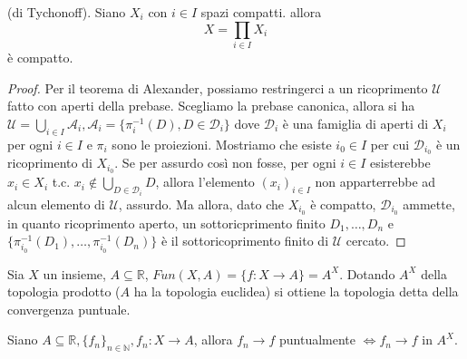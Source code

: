 \begin{thm} \label{tychonoff}
    (di Tychonoff). Siano $X_i$ con $i\in I$ spazi compatti. allora
    \[
        X=\prod_{i\in I}X_i
    \]
    \`e compatto.
\end{thm}
\begin{proof}
  Per il teorema di Alexander, possiamo restringerci a un ricoprimento $\mathcal{U}$ fatto con aperti della prebase. Scegliamo la prebase canonica, allora si ha $\displaystyle \mathcal{U}=\bigcup_{i \in I} \mathcal{A}_i, \mathcal{A}_i=\{\pi_i^{-1}(D), D \in \mathcal{D}_i\}$ dove $\mathcal{D}_i$ è una famiglia di aperti di $X_i$ per ogni $i \in I$ e $\pi_i$ sono le proiezioni.
  Mostriamo che esiste $i_0 \in I$ per cui $\mathcal{D}_{i_0}$ è un ricoprimento di $X_{i_0}$. Se per assurdo così non fosse, per ogni $i \in I$ esisterebbe $x_i \in X_i$ t.c. $\displaystyle x_i \not \in \bigcup_{D \in \mathcal{D}_i} D$, allora l'elemento $(x_i)_{i \in I}$ non apparterrebbe ad alcun elemento di $\mathcal{U}$, assurdo.
  Ma allora, dato che $X_{i_0}$ è compatto, $\mathcal{D}_{i_0}$ ammette, in quanto ricoprimento aperto, un sottoricprimento finito $D_1, \dots, D_n$ e $\{\pi_{i_0}^{-1}(D_1), \dots, \pi_{i_0}^{-1}(D_n)\}$ è il sottoricoprimento finito di $\mathcal{U}$ cercato.
\end{proof}

\begin{ex}
  Sia $X$ un insieme, $A \subseteq \mathbb{R}$, $Fun(X, A)=\{f:X \rightarrow A\}=A^X$. Dotando $A^X$ della topologia prodotto ($A$ ha la topologia euclidea) si ottiene la topologia detta della convergenza puntuale.
\end{ex}

\begin{lm}
  Siano $A \subseteq \mathbb{R}, \{f_n\}_{n \in \mathbb{N}}, f_n:X \rightarrow A$, allora $f_n \rightarrow f$ puntualmente $\Leftrightarrow f_n \rightarrow f$ in $A^X$.
\end{lm}

